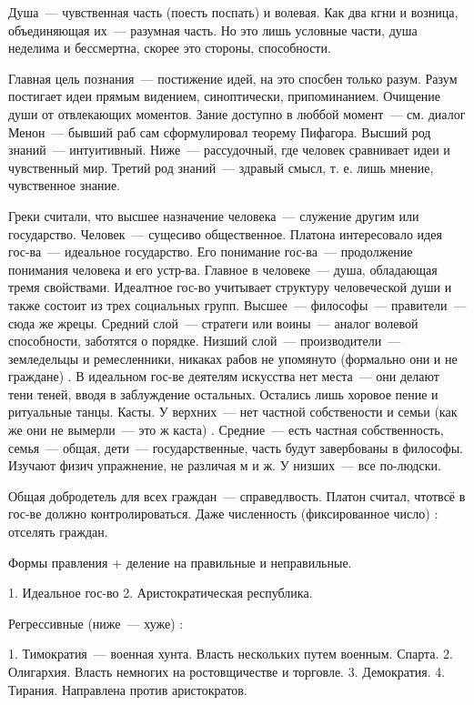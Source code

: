 Душа~--- чувственная часть (поесть поспать) и волевая. Как два кгни и возница, объединяющая их~--- разумная часть. Но это лишь условные части, душа неделима и бессмертна, скорее это стороны, способности. 

Главная цель познания~--- постижение идей, на это спосбен только разум. Разум постигает идеи прямым видением, синоптически, припоминанием. 
Очищение души от отвлекающих моментов. Зание доступно в люббой момент~--- см. диалог Менон~--- бывший раб сам сформулировал теорему Пифагора. 
Высший род знаний~--- интуитивный. Ниже~--- рассудочный, где человек сравнивает идеи и чувственный мир. Третий род знаний~--- здравый смысл, т. е. лишь мнение, чувственное знание. 

Греки считали, что высшее назначение человека~--- служение другим или государство. Человек~--- сущесиво общественное. 
Платона интересовало идея гос-ва~--- идеальное государство. Его понимание гос-ва~--- продолжение понимания человека и его устр-ва. Главное в человеке~--- душа, обладающая тремя свойствами. 
Идеалтное гос-во учитывает структуру человеческой души и также состоит из трех социальных групп. Высшее~--- философы~--- правители~--- сюда же жрецы. Средний слой~--- стратеги или воины~--- аналог волевой способности, заботятся о порядке. 
Низший слой~--- производители~--- земледельцы и ремесленники, никаках рабов не упомянуто (формально они и не граждане) . 
В идеальном гос-ве деятелям искусства нет места~--- они делают тени теней, вводя в заблуждение остальных. Остались лишь хоровое пение и ритуальные танцы. Касты. 
У верхних~--- нет частной собствености и семьи (как же они не вымерли~--- это ж каста) . Средние~--- есть частная собственность, семья~--- общая, дети~--- государственные, часть будут завербованы в философы. 
Изучают физич упражнение, не различая м и ж. 
У низших~--- все по-людски. 

Общая добродетель для всех граждан~--- справедлвость. 
Платон считал, чтотвсё в гос-ве должно контролироваться. Даже численность (фиксированное число) : отселять граждан. 

Формы правления + деление на правильные и неправильные. 

	1. Идеальное гос-во
	2. Аристократическая республика. 

Регрессивные (ниже~--- хуже) :

	1. Тимократия~--- военная хунта. Власть нескольких путем военным. Спарта. 
	2. Олигархия. Власть немногих на ростовщичестве и торговле. 
	3. Демократия. 
	4. Тирания. Направлена против аристократов. 


